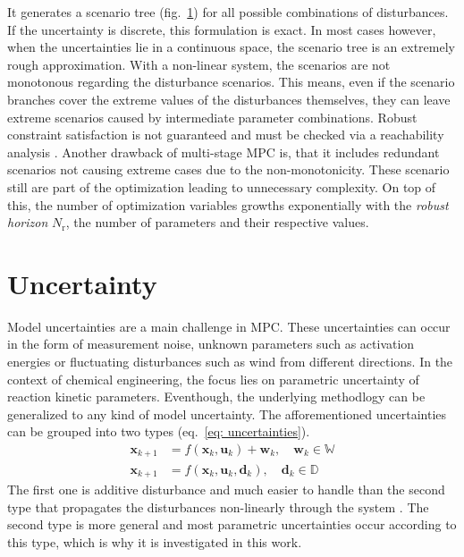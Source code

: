 It generates a scenario tree (fig.~\ref{}) for all 
possible combinations of disturbances. If the uncertainty is discrete, this formulation is exact.
In most cases however, when the uncertainties lie in a continuous space, the scenario tree
is an extremely rough approximation. With a non-linear system, the scenarios are not monotonous regarding the
disturbance scenarios. This means, even if the scenario branches cover the extreme values of the disturbances
themselves, they can leave extreme scenarios caused by intermediate parameter combinations. Robust 
constraint satisfaction is not guaranteed and must be checked via a reachability analysis \cite{lucia2015}.
Another drawback of multi-stage MPC is, that it includes redundant scenarios not causing extreme cases due to 
the non-monotonicity. These scenario still are part of the optimization leading to unnecessary complexity.
On top of this, the number of optimization variables growths exponentially with the \emph{robust horizon} $N_\text{r}$,
the number of parameters and their respective values. 





\section{Uncertainty}
Model uncertainties are a main challenge in MPC. These uncertainties can occur in the form of measurement noise, unknown parameters such as 
activation energies or fluctuating disturbances such as wind from different directions. In the context of chemical engineering, the
focus lies on parametric uncertainty of reaction kinetic parameters. Eventhough, the underlying methodlogy can be generalized to any kind of 
model uncertainty.
\newline
The afforementioned uncertainties can be grouped into two types (eq.~\ref{eq: uncertainties}).
\begin{equation}
    \label{eq: uncertainties}
    \begin{aligned}
        \bm{x}_{k+1} &= f(\bm{x}_k, \bm{u}_k) + \bm{w}_k, \quad \bm{w}_k \in \mathbb{W}
        \\
        \bm{x}_{k+1} &= f(\bm{x}_k, \bm{u}_k, \bm{d}_k), \quad \bm{d}_k \in \mathbb{D}
    \end{aligned}
\end{equation}
The first one is additive disturbance and much easier to handle than the second type that propagates the disturbances non-linearly
through the system \cite{empty000}. The second type is more general and most parametric uncertainties occur according to this type, which is why
it is investigated in this work. 

